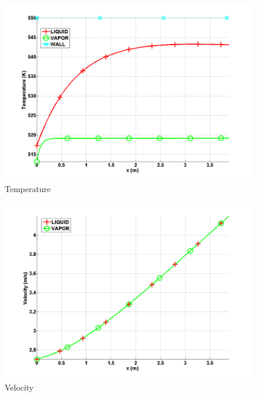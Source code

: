 %
        \begin{figure}[H]
                \centering
                \includegraphics[width=\textwidth]{figures/SEM/ANS_WINTER_2014_7Eqn_temperature.png}
                \caption{Temperature}
                \label{fig:temperature}
        \end{figure}%
%            
        \begin{figure}[H]
                \centering
                \includegraphics[width=\textwidth]{figures/SEM/ANS_WINTER_2014_7Eqn_velocity.png}
                \caption{Velocity}
                \label{fig:velocity}
        \end{figure}
%
